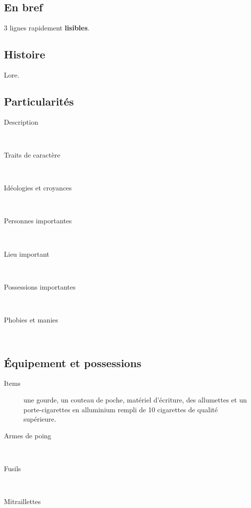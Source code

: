 \documentclass[11pt]{article}
\begin{document}
\begin{twocols}
\subsection{En bref}
\label{sec:orgb3cf3a5}

3 lignes rapidement \textbf{lisibles}.

\subsection{Histoire}
\label{sec:org16d887b}

Lore. 

\subsection{Particularités}
\label{sec:org0a638c2}

\begin{description}
\item[{Description}] ~\\[2em]
\item[{Traits de caractère}] ~\\[2em]
\item[{Idéologies et croyances}] ~\\[2em]
\item[{Personnes importantes}] ~\\[2em]
\item[{Lieu important}] ~\\[2em]
\item[{Possessions importantes}] ~\\[2em]
\item[{Phobies et manies}] ~\\[2em]
\end{description}

\subsection{Équipement et possessions}
\label{sec:orgcf84995}


\begin{description}
\item[{Items}] une gourde, un couteau de poche, matériel d'écriture, des allumettes et un porte-cigarettes en alluminium rempli de 10 cigarettes de qualité supérieure. 
~\\[2em]
\item[{Armes de poing}] ~\\[2em]
\item[{Fusils}] ~\\[2em]
\item[{Mitraillettes}] ~\\[2em]
\end{description}

\end{twocols}
\end{document}

